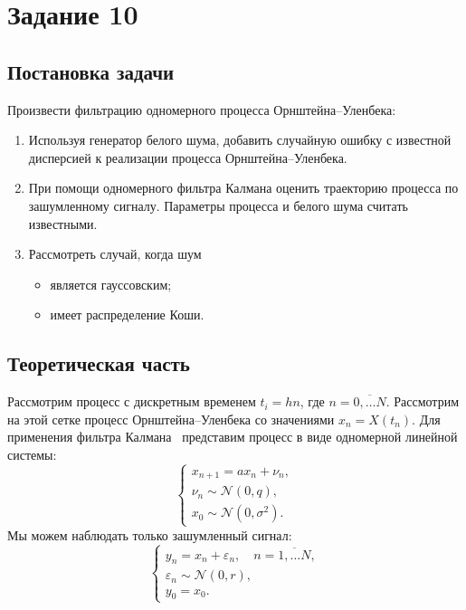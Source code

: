 \documentclass[12pt, a4paper]{article} %
\renewcommand{\epsilon}{\varepsilon}
\def\Norm{\mathcal{N}} %
\begin{document}
\section{Задание 10}
\subsection{Постановка задачи}
Произвести фильтрацию одномерного процесса Орнштейна--Уленбека:
\begin{enumerate}
	\item Используя генератор белого шума, добавить случайную ошибку с известной дисперсией к реализации процесса Орнштейна--Уленбека.
	\item При помощи одномерного фильтра Калмана оценить траекторию процесса по зашумленному сигналу. Параметры процесса и белого шума считать известными.
	\item Рассмотреть случай, когда шум
	\begin{itemize}
		\item является гауссовским;
		\item имеет распределение Коши.
	\end{itemize}
\end{enumerate}

\subsection{Теоретическая часть}
Рассмотрим процесс с дискретным временем $t_i = hn$, где $n = \overline{0,\ldots N}$.
Рассмотрим на этой сетке процесс Орнштейна--Уленбека со значениями  $x_n = X(t_n)$.
Для применения фильтра Калмана~\cite{Bishop} представим процесс в виде одномерной линейной системы:
\[
    \begin{cases}
        x_{n+1} = ax_n + \nu_n, \\
        \nu_n \sim \Norm(0, q), \\
        x_0 \sim \Norm(0, \sigma^2).
    \end{cases}
\] 
Мы можем наблюдать только зашумленный сигнал:
\[
    \begin{cases}
        y_n = x_n + \epsilon_n,\quad n = \overline{1,\ldots N}, \\
        \epsilon_n \sim \Norm(0, r), \\
        y_0 = x_0.
    \end{cases}
\] 
\end{document}
